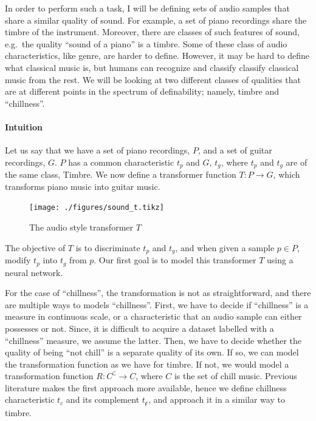 \documentclass[12pt,a4paper,]{report}
\begin{document}
In order to perform such a task, I will be defining sets of audio
samples that share a similar quality of sound. For example, a set of
piano recordings share the timbre of the instrument. Moreover, there are
classes of such features of sound, e.g.~the quality ``sound of a piano''
is a timbre. Some of these class of audio characteristics, like genre,
are harder to define. However, it may be hard to define what classical
music is, but humans can recognize and classify classify classical music
from the rest. We will be looking at two different classes of qualities
that are at different points in the spectrum of definability; namely,
timbre and ``chillness''.\\

\paragraph{Intuition}

Let us say that we have a set of piano recordings, \(P\), and a set of
guitar recordings, \(G\). \(P\) has a common characteristic \(t_p\) and
\(G\), \(t_g\), where \(t_p\) and \(t_g\) are of the same class, Timbre.
We now define a transformer function \(T: P \rightarrow G\), which
transforms piano music into guitar music.

\begin{figure}
    \texttt{[image: ./figures/sound\_t.tikz]}
    \centering
    \caption{The audio style transformer $T$}
\end{figure}

The objective of \(T\) is to discriminate \(t_p\) and \(t_g\), and when
given a sample \(p \in P\), modify \(t_p\) into \(t_g\) from \(p\). Our
first goal is to model this transformer \(T\) using a neural network.

For the case of ``chillness'', the transformation is not as
straightforward, and there are multiple ways to models ``chillness''.
First, we have to decide if ``chillness'' is a measure in continuous
scale, or a characteristic that an audio sample can either possesses or
not. Since, it is difficult to acquire a dataset labelled with a
``chillness'' measure, we assume the latter. Then, we have to decide
whether the quality of being ``not chill'' is a separate quality of its
own. If so, we can model the transformation function as we have for
timbre. If not, we would model a transformation function
\(R: C^\complement \rightarrow C\), where \(C\) is the set of chill
music. Previous literature makes the first approach more available,
hence we define chillness characteristic \(t_c\) and its complement
\(t_{\not c}\), and approach it in a similar way to timbre.
\end{document}
